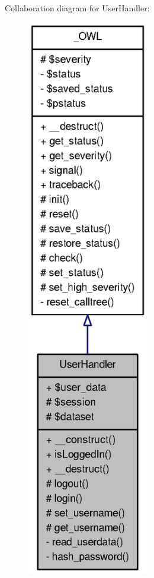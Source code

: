 Collaboration diagram for UserHandler:\nopagebreak
\begin{figure}[H]
\begin{center}
\leavevmode
\includegraphics[width=150pt]{classUserHandler__coll__graph}
\end{center}
\end{figure}
